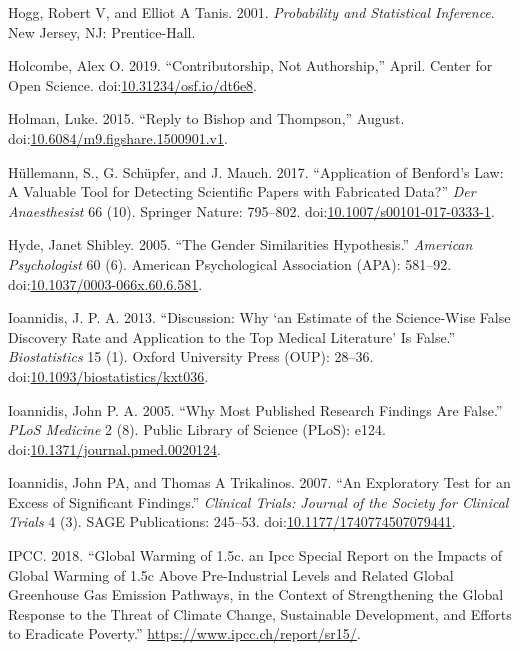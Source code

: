 \documentclass[a5paper]{book}
\begin{document}
\hypertarget{ref-hogg-tanis}{}
Hogg, Robert V, and Elliot A Tanis. 2001. \emph{Probability and
Statistical Inference}. New Jersey, NJ: Prentice-Hall.

\hypertarget{ref-doi:10.31234ux2fosf.ioux2fdt6e8}{}
Holcombe, Alex O. 2019. ``Contributorship, Not Authorship,'' April.
Center for Open Science.
doi:\href{https://doi.org/10.31234/osf.io/dt6e8}{10.31234/osf.io/dt6e8}.

\hypertarget{ref-doi:10.6084ux2fm9.figshare.1500901.v1}{}
Holman, Luke. 2015. ``Reply to Bishop and Thompson,'' August.
doi:\href{https://doi.org/10.6084/m9.figshare.1500901.v1}{10.6084/m9.figshare.1500901.v1}.

\hypertarget{ref-doi:10.1007ux2fs00101-017-0333-1}{}
Hüllemann, S., G. Schüpfer, and J. Mauch. 2017. ``Application of
Benford's Law: A Valuable Tool for Detecting Scientific Papers with
Fabricated Data?'' \emph{Der Anaesthesist} 66 (10). Springer Nature:
795--802.
doi:\href{https://doi.org/10.1007/s00101-017-0333-1}{10.1007/s00101-017-0333-1}.

\hypertarget{ref-doi:10.1037ux2f0003-066x.60.6.581}{}
Hyde, Janet Shibley. 2005. ``The Gender Similarities Hypothesis.''
\emph{American Psychologist} 60 (6). American Psychological Association
(APA): 581--92.
doi:\href{https://doi.org/10.1037/0003-066x.60.6.581}{10.1037/0003-066x.60.6.581}.

\hypertarget{ref-doi:10.1093ux2fbiostatisticsux2fkxt036}{}
Ioannidis, J. P. A. 2013. ``Discussion: Why `an Estimate of the
Science-Wise False Discovery Rate and Application to the Top Medical
Literature' Is False.'' \emph{Biostatistics} 15 (1). Oxford University
Press (OUP): 28--36.
doi:\href{https://doi.org/10.1093/biostatistics/kxt036}{10.1093/biostatistics/kxt036}.

\hypertarget{ref-doi:10.1371ux2fjournal.pmed.0020124}{}
Ioannidis, John P. A. 2005. ``Why Most Published Research Findings Are
False.'' \emph{PLoS Medicine} 2 (8). Public Library of Science (PLoS):
e124.
doi:\href{https://doi.org/10.1371/journal.pmed.0020124}{10.1371/journal.pmed.0020124}.

\hypertarget{ref-doi:10.1177ux2f1740774507079441}{}
Ioannidis, John PA, and Thomas A Trikalinos. 2007. ``An Exploratory Test
for an Excess of Significant Findings.'' \emph{Clinical Trials: Journal
of the Society for Clinical Trials} 4 (3). SAGE Publications: 245--53.
doi:\href{https://doi.org/10.1177/1740774507079441}{10.1177/1740774507079441}.

\hypertarget{ref-ipccGlobalWarmingIPCC2018}{}
IPCC. 2018. ``Global Warming of 1.5c. an Ipcc Special Report on the
Impacts of Global Warming of 1.5c Above Pre-Industrial Levels and
Related Global Greenhouse Gas Emission Pathways, in the Context of
Strengthening the Global Response to the Threat of Climate Change,
Sustainable Development, and Efforts to Eradicate Poverty.''
\url{https://www.ipcc.ch/report/sr15/}.
\end{document}
